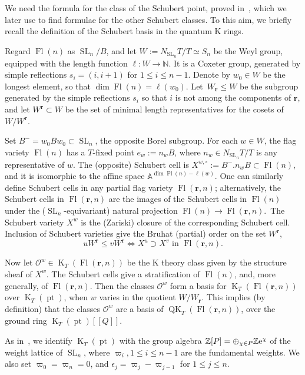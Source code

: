 \documentclass[pdftex]{sigma}
\numberwithin{equation}{section}
\theoremstyle{definition}
\DeclareMathOperator{\SL}{SL}
\DeclareMathOperator{\Fl}{Fl}
\DeclareMathOperator{\QK}{QK}
\DeclareMathOperator{\K}{K}
\DeclareMathOperator{\pt}{pt}
\newcommand{\bfr}{{\mathbf r}}
\newcommand{\Z}{{\mathbb Z}}
\newcommand{\cO}{{\mathcal O}}
\begin{document}
We need the formula for the class of the Schubert point, proved
in~\cite{maeno2023presentation}, which we later use
to find formulae for the other Schubert classes. To this aim, we briefly recall
the definition of the Schubert basis in the quantum K rings.

Regard $\Fl(n)$ as $\SL_n/B$, and let $W:=N_{\SL_n}T/T \simeq S_n$ be the Weyl group,
equipped with the length function $\ell\colon W \to \mathbb{N}$. It is a Coxeter group,
generated by simple reflections $s_i=(i,i+1)$ for $1 \le i \le n-1$.
Denote by $w_0 \in W$ be the longest element, so that $\dim \Fl(n) = \ell(w_0)$.
Let~${W_{\bfr} \le W}$ be the subgroup generated by the simple
reflections $s_i$ so that $i$ is not among the components of $\bfr$,
and let $W^{\bfr} \subset W$ be the set of minimal length representatives
for the cosets of~$W/W^{\bfr}$.

Set $B^- = w_0 B w_0 \subset \SL_n$,
the opposite Borel subgroup. For each $w \in W$, the flag
variety $\Fl(n)$ has a $T$-fixed point $e_w:= n_wB$, where
$n_w \in N_{\SL_n}T/T$ is any representative of $w$. The
(opposite) Schubert cell is
$X^{w,\circ}:= B^-.n_wB \subset \Fl(n)$, and it is
isomorphic to the affine space $\mathbb{A}^{\dim \Fl(n) - \ell(w)}$.
One can similarly define Schubert cells in any partial flag variety $\Fl(\bfr,n)$;
alternatively, the Schubert cells in $\Fl(\bfr,n)$ are the images of
the Schubert cells in $\Fl(n)$ under the ($\SL_n$-equivariant)
natural projection $\Fl(n) \to \Fl(\bfr,n)$.~The Schubert variety
$X^w$ is the (Zariski) closure of the corresponding Schubert cell.
Inclusion of Schubert varieties give the Bruhat (partial) order on the set $W^{\bfr}$,
\[ u W^{\bfr} \le v W^{\bfr} \Leftrightarrow X^u \supset X^v \textrm{ in } \Fl(\bfr,n) . \]

Now let
$\cO^w \in \K_T(\Fl(\bfr,n))$ be the K theory class given by the structure sheaf
of $X^w$. The Schubert cells give a stratification of $\Fl(n)$, and, more generally, of $\Fl(\bfr,n)$.
Then the classes $\cO^w$ form a basis for $\K_T(\Fl(\bfr,n))$ over $\K_T(\pt)$,
when $w$ varies in the quotient $W/W_{\bfr}$.
This implies (by definition) that the classes $\cO^w$ are a basis of
$\QK_T(\Fl(\bfr,n))$, over the ground ring $\K_T(\pt)[\![Q]\!]$.

As in~\cite{maeno2023presentation}, we identify $\K_T(\pt)$
with the group algebra $\Z[P]=\oplus_{\chi\in P}\Z {\rm e}^\chi$ of the
weight lattice \smash{$P=\sum_{i=1}^{n-1}\Z \varpi_i$} of $\SL_n$,
where $\varpi_i, 1\leq i\leq n-1$ are the fundamental weights. We also
set $\varpi_0=\varpi_n=0$, and $\epsilon_j=\varpi_j-\varpi_{j-1}$ for $1\leq j\leq n$.
\end{document}
